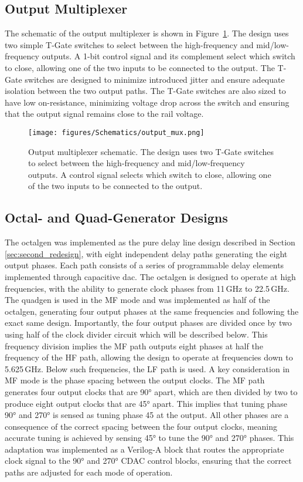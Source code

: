 \subsection{Output Multiplexer}
The schematic of the output multiplexer is shown in Figure~\ref{fig:output_mux}. The design uses two simple T-Gate switches to select between the high-frequency and mid/low-frequency outputs.
A 1-bit control signal and its complement select which switch to close, allowing one of the two inputs to be connected to the output. The T-Gate switches are designed to minimize introduced jitter and ensure adequate isolation between the two output paths. The T-Gate switches are also sized to have low on-resistance, minimizing voltage drop across the switch and ensuring that the output signal remains close to the rail voltage.
\begin{figure}[h]
  \centering
  \texttt{[image: figures/Schematics/output\_mux.png]}
  \caption{Output multiplexer schematic. The design uses two T-Gate switches to select between the high-frequency and mid/low-frequency outputs. A control signal selects which switch to close, allowing one of the two inputs to be connected to the output.}
  \label{fig:output_mux}
\end{figure}
\subsection{Octal- and Quad-Generator Designs}\label{sec:octal_quad_gen_design}
The \gls{octalgen} was implemented as the pure delay line design described in Section \ref{sec:second_redesign}, with eight independent delay paths generating the eight output phases. Each path consists of a series of programmable delay elements implemented through capacitive \gls{dac}. The \gls{octalgen} is designed to operate at high frequencies, with the ability to generate clock phases from 11\,GHz to 22.5\,GHz. 
The \gls{quadgen} is used in the MF mode and was implemented as half of the \gls{octalgen}, generating four output phases at the same frequencies and following the exact same design. Importantly, the four output phases are divided once by two using half of the clock divider circuit which will be described below. This frequency division implies the MF path outputs eight phases at half the frequency of the HF path, allowing the design to operate at frequencies down to 5.625\,GHz. Below such frequencies, the LF path is used.
A key consideration in MF mode is the phase spacing between the output clocks. The MF path generates four output clocks that are \ang{90} apart, which are then divided by two to produce eight output clocks that are \ang{45} apart. This implies that tuning phase \ang{90} and \ang{270} is sensed as tuning phase 45 at the output. All other phases are a consequence of the correct spacing between the four output clocks, meaning accurate tuning is achieved by sensing \ang{45} to tune the \ang{90} and \ang{270} phases. This adaptation was implemented as a Verilog-A block that routes the appropriate clock signal to the \ang{90} and \ang{270} CDAC control blocks, ensuring that the correct paths are adjusted for each mode of operation.
